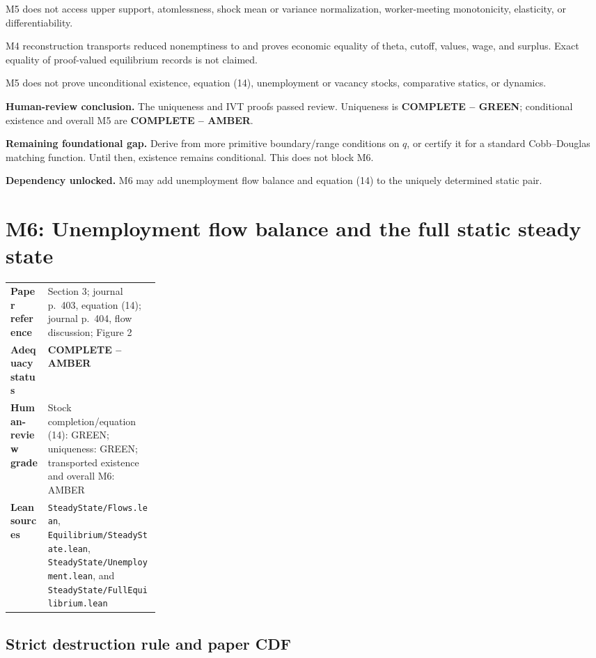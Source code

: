 \documentclass[11pt]{article}
\newcommand{\code}[1]{\texttt{\detokenize{#1}}}
\newcommand{\completeGreen}{\textcolor{green!50!black}{\textbf{COMPLETE -- GREEN}}}
\newcommand{\statusReview}[1]{\textcolor{amber}{\textbf{#1}}}
\begin{document}
M5 does not access upper support, atomlessness, shock mean or variance
normalization, worker-meeting monotonicity, elasticity, or differentiability.

M4 reconstruction transports reduced nonemptiness to
\code{ValueEquilibrium} and proves economic equality of theta, cutoff, values,
wage, and surplus. Exact equality of proof-valued equilibrium records is not
claimed.

M5 does not prove unconditional existence, equation (14), unemployment or
vacancy stocks, comparative statics, or dynamics.

\textbf{Human-review conclusion.} The uniqueness and IVT proofs passed review.
Uniqueness is \completeGreen; conditional existence and overall M5 are
\statusReview{COMPLETE -- AMBER}.

\textbf{Remaining foundational gap.} Derive \code{lower_crossing} from more
primitive boundary/range conditions on \(q\), or certify it for a standard
Cobb--Douglas matching function. Until then, existence remains conditional.
This does not block M6.

\textbf{Dependency unlocked.} M6 may add unemployment flow balance and
equation (14) to the uniquely determined static pair.

\section{M6: Unemployment flow balance and the full static steady state}

\begin{tabularx}{\linewidth}{@{}>{\bfseries}p{0.25\linewidth}X@{}}
Paper reference & Section 3; journal p.~403, equation (14); journal p.~404,
flow discussion; Figure 2\\
Adequacy status & \statusReview{COMPLETE -- AMBER}\\
Human-review grade & Stock completion/equation (14): GREEN; uniqueness: GREEN;
transported existence and overall M6: AMBER\\
Lean sources & \nolinkurl{SteadyState/Flows.lean},
\nolinkurl{Equilibrium/SteadyState.lean},
\nolinkurl{SteadyState/Unemployment.lean}, and
\nolinkurl{SteadyState/FullEquilibrium.lean}\\
\end{tabularx}

\subsection{Strict destruction rule and paper CDF}
\end{document}
